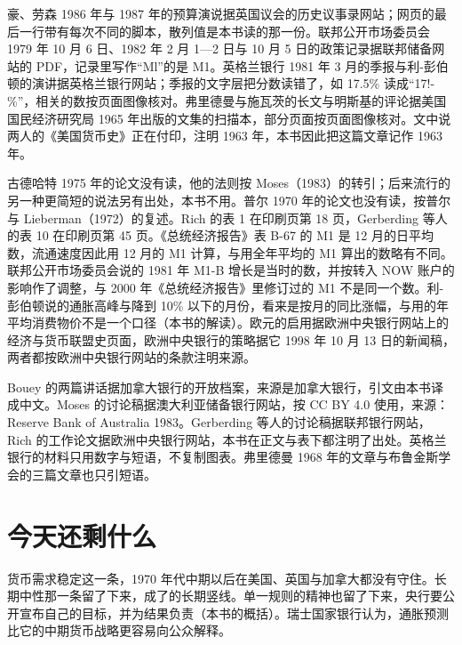 \begin{deeper}[史料说明]
豪、劳森 1986 年与 1987 年的预算演说据英国议会的历史议事录网站；网页的最后一行带有每次不同的脚本，散列值是本书读的那一份。联邦公开市场委员会 1979 年 10 月 6 日、1982 年 2 月 1—2 日与 10 月 5 日的政策记录据联邦储备网站的 PDF，记录里写作“Ml”的是 M1。英格兰银行 1981 年 3 月的季报与利-彭伯顿的演讲据英格兰银行网站；季报的文字层把分数读错了，如 17.5\% 读成“17!-\%”，相关的数按页面图像核对。弗里德曼与施瓦茨的长文与明斯基的评论据美国国民经济研究局 1965 年出版的文集的扫描本，部分页面按页面图像核对。文中说两人的《美国货币史》正在付印，注明 1963 年，本书因此把这篇文章记作 1963 年。

古德哈特 1975 年的论文没有读，他的法则按 Moses（1983）的转引；后来流行的另一种更简短的说法另有出处，本书不用。普尔 1970 年的论文也没有读，按普尔与 Lieberman（1972）的复述。Rich 的表 1 在印刷页第 18 页，Gerberding 等人的表 10 在印刷页第 45 页。《总统经济报告》表 B-67 的 M1 是 12 月的日平均数，流通速度因此用 12 月的 M1 计算，与用全年平均的 M1 算出的数略有不同。联邦公开市场委员会说的 1981 年 M1-B 增长是当时的数，并按转入 NOW 账户的影响作了调整，与 2000 年《总统经济报告》里修订过的 M1 不是同一个数。利-彭伯顿说的通胀高峰与降到 10\% 以下的月份，看来是按月的同比涨幅，与用的年平均消费物价不是一个口径（本书的解读）。欧元的启用据欧洲中央银行网站上的经济与货币联盟史页面，欧洲中央银行的策略据它 1998 年 10 月 13 日的新闻稿，两者都按欧洲中央银行网站的条款注明来源。

Bouey 的两篇讲话据加拿大银行的开放档案，来源是加拿大银行，引文由本书译成中文。Moses 的讨论稿据澳大利亚储备银行网站，按 CC BY 4.0 使用，来源：Reserve Bank of Australia 1983。Gerberding 等人的讨论稿据联邦银行网站，Rich 的工作论文据欧洲中央银行网站，本书在正文与表下都注明了出处。英格兰银行的材料只用数字与短语，不复制图表。弗里德曼 1968 年的文章与布鲁金斯学会的三篇文章也只引短语。
\end{deeper}

\section{今天还剩什么}\label{sec:monetarism-legacy}

货币需求稳定这一条，1970 年代中期以后在美国、英国与加拿大都没有守住。长期中性那一条留了下来，成了的长期竖线。单一规则的精神也留了下来，央行要公开宣布自己的目标，并为结果负责（本书的概括）。瑞士国家银行认为，通胀预测比它的中期货币战略更容易向公众解释\cite{rich2003}。

